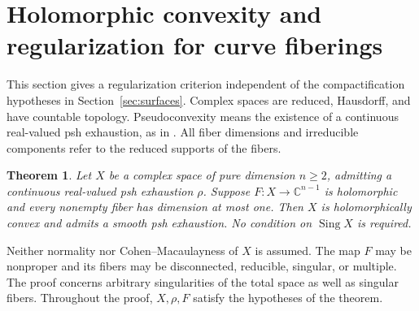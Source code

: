 \documentclass[11pt]{amsart}
\newtheorem{theorem}{Theorem}[section]
\theoremstyle{definition}
\theoremstyle{remark}
\numberwithin{equation}{section}
\newcommand{\C}{\mathbb C}
\begin{document}
\section{Holomorphic convexity and regularization for curve fiberings}
\label{sec:curve-fibers}
This section gives a regularization criterion independent of the
compactification hypotheses in Section~\ref{sec:surfaces}.
Complex spaces are reduced, Hausdorff, and have countable topology.
Pseudoconvexity means the existence of a continuous real-valued
psh exhaustion, as in \cite[p.~455]{VijituForum2022}.
All fiber dimensions and irreducible components refer to the reduced
supports of the fibers.

\begin{theorem}\label{thm:curve-fiber-convexity}
Let \(X\) be a complex space of pure dimension \(n\ge2\), admitting a
continuous real-valued psh exhaustion \(\rho\).
Suppose \(F:X\to\C^{n-1}\) is holomorphic and every nonempty fiber
has dimension at most one.  Then \(X\) is holomorphically convex
and admits a smooth psh exhaustion.
No condition on \(\operatorname{Sing}X\) is required.
\end{theorem}

Neither normality nor Cohen--Macaulayness of \(X\) is assumed.
The map \(F\) may be nonproper and its fibers may be disconnected,
reducible, singular, or multiple.  The proof concerns arbitrary
singularities of the total space as well as singular fibers.
Throughout the proof, \(X,\rho,F\) satisfy the hypotheses of the theorem.
\end{document}

